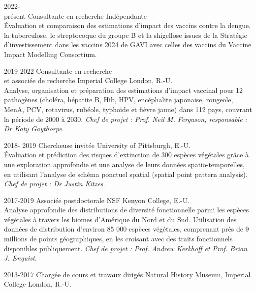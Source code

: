 \documentclass[icon]{twentysecondcv}
\begin{document}
\begin{twenty} %


 \twentyitem
    	{2022-\\présent}
    	{Consultante en recherche}
	{Indépendante}
        	{\\ \small Évaluation et comparaison des estimations d’impact des vaccins contre la dengue, la tuberculose, le streptocoque du groupe B et la shigellose issues de la Stratégie d’investissement dans les vaccins 2024 de GAVI avec celles des vaccins du Vaccine Impact Modelling Consortium.}
        	
	
 \twentyitem
       {2019-2022}
       {Consultante en recherche \\ et associée de recherche}
       {Imperial College London, R.-U.}
       {\\ \small Analyse, organisation et préparation des estimations d’impact vaccinal pour 12 pathogènes (choléra, hépatite B, Hib, HPV, encéphalite japonaise, rougeole, MenA, PCV, rotavirus, rubéole, typhoïde et fièvre jaune) dans 112 pays, couvrant la période de 2000 à 2030. \textit{Chef de projet : Prof. Neil M. Ferguson, responsable : Dr Katy Gaythorpe}.}
      
\twentyitem
    	{2018- 2019}
	{Chercheuse invitée}
        	{University of Pittsburgh, E.-U.}
        	{\\ \small Évaluation et prédiction des risques d’extinction de 300 espèces végétales grâce à une exploration approfondie et une analyse de leurs données spatio-temporelles, en utilisant l’analyse de schéma ponctuel spatial (spatial point pattern analysis).  \textit{Chef de projet : Dr Justin Kitzes}.}

	\twentyitem
    	{2017-2019}
	{Associée postdoctorale NSF}
        {Kenyon College, E.-U.}
        {\\ \small Analyse approfondie des distributions de diversité fonctionnelle parmi les espèces végétales à travers les biomes d’Amérique du Nord et du Sud. Utilisation des données de distribution d’environ 85 000 espèces végétales, comprenant près de 9 millions de points géographiques, en les croisant avec des traits fonctionnels disponibles publiquement. \textit{Chef de projet : Prof. Andrew Kerkhoff et  Prof. Brian J. Enquist}. }
      
    
    \twentyitem
	{2013-2017}
	{Chargée de cours et travaux dirigés}
	{Natural History Museum, Imperial College London, R.-U.}
	{}
\end{twenty}
\end{document}
